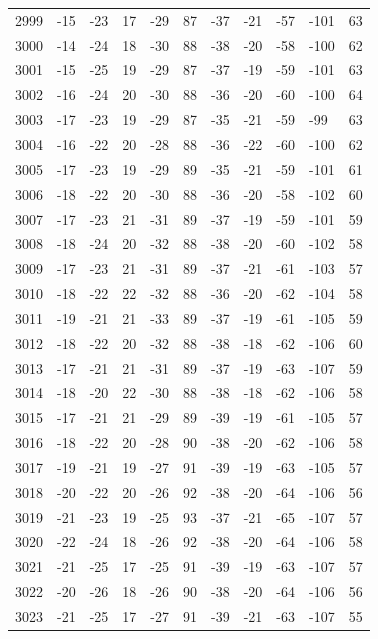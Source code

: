 \begin{table}[H]
\begin{tabular}{lllllllllll}
2999 & -15 & -23 & 17 & -29 & 87 & -37 & -21 & -57 & -101 & 63 \\
3000 & -14 & -24 & 18 & -30 & 88 & -38 & -20 & -58 & -100 & 62 \\
3001 & -15 & -25 & 19 & -29 & 87 & -37 & -19 & -59 & -101 & 63 \\
3002 & -16 & -24 & 20 & -30 & 88 & -36 & -20 & -60 & -100 & 64 \\
3003 & -17 & -23 & 19 & -29 & 87 & -35 & -21 & -59 & -99 & 63 \\
3004 & -16 & -22 & 20 & -28 & 88 & -36 & -22 & -60 & -100 & 62 \\
3005 & -17 & -23 & 19 & -29 & 89 & -35 & -21 & -59 & -101 & 61 \\
3006 & -18 & -22 & 20 & -30 & 88 & -36 & -20 & -58 & -102 & 60 \\
3007 & -17 & -23 & 21 & -31 & 89 & -37 & -19 & -59 & -101 & 59 \\
3008 & -18 & -24 & 20 & -32 & 88 & -38 & -20 & -60 & -102 & 58 \\
3009 & -17 & -23 & 21 & -31 & 89 & -37 & -21 & -61 & -103 & 57 \\
3010 & -18 & -22 & 22 & -32 & 88 & -36 & -20 & -62 & -104 & 58 \\
3011 & -19 & -21 & 21 & -33 & 89 & -37 & -19 & -61 & -105 & 59 \\
3012 & -18 & -22 & 20 & -32 & 88 & -38 & -18 & -62 & -106 & 60 \\
3013 & -17 & -21 & 21 & -31 & 89 & -37 & -19 & -63 & -107 & 59 \\
3014 & -18 & -20 & 22 & -30 & 88 & -38 & -18 & -62 & -106 & 58 \\
3015 & -17 & -21 & 21 & -29 & 89 & -39 & -19 & -61 & -105 & 57 \\
3016 & -18 & -22 & 20 & -28 & 90 & -38 & -20 & -62 & -106 & 58 \\
3017 & -19 & -21 & 19 & -27 & 91 & -39 & -19 & -63 & -105 & 57 \\
3018 & -20 & -22 & 20 & -26 & 92 & -38 & -20 & -64 & -106 & 56 \\
3019 & -21 & -23 & 19 & -25 & 93 & -37 & -21 & -65 & -107 & 57 \\
3020 & -22 & -24 & 18 & -26 & 92 & -38 & -20 & -64 & -106 & 58 \\
3021 & -21 & -25 & 17 & -25 & 91 & -39 & -19 & -63 & -107 & 57 \\
3022 & -20 & -26 & 18 & -26 & 90 & -38 & -20 & -64 & -106 & 56 \\
3023 & -21 & -25 & 17 & -27 & 91 & -39 & -21 & -63 & -107 & 55 \\

\end{tabular}
\end{table}
